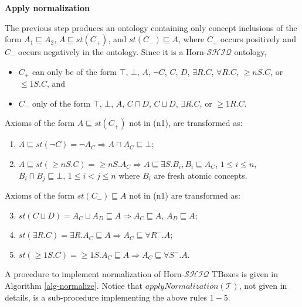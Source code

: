 \documentclass[oneside]{book}
\newcommand{\shiq}{$\mathcal{SHIQ}$\xspace}
\newcommand{\hshiq}{Horn-\shiq\xspace}
\newcommand{\T}{\mathcal{T}}
\newcommand{\dlisa}{\sqsubseteq}
\newcommand{\dland}{\sqcap}
\newcommand{\dlor}{\sqcup}
\begin{document}
\textbf{Apply normalization}

The previous step produces an ontology containing only concept inclusions of the form $A_1 \dlisa A_2$, $ A \dlisa st(C_+)$, and $st(C_-) \dlisa A$, where $C_+$ occurs positively and $C_-$ occurs negatively in the ontology. Since it is a \hshiq ontology, 
\begin{itemize}
	\item $C_+$ can only be of the form $\top$, $\bot$, $A$, $\neg C$, $C$, $D$, $\exists R.C$, $\forall R.C$, $\geq nS.C$, or $\leq 1S.C$, and
	\item  $C_-$ only of the form $\top$, $\bot$, $A$, $C \dland D$, $C \dlor D$, $\exists R.C$, or $\geq 1R.C$.
\end{itemize}
Axioms of the form $A \dlisa st(C_+)$ not in (n1), are transformed as: 
\begin{enumerate}
	\item $A \dlisa st(\neg C) = \neg A_C \Rightarrow A \dland  A_C \dlisa \bot$; 
	\item $A \dlisa st(\geq nS.C) = \geq nS.A_C \Rightarrow A \dlisa \exists S.B_i, B_i \dlisa A_C$, $1 \leq i \leq n$, $B_i \dland B_j \dlisa \bot$, $1 \leq i < j \leq n$ where $B_i$ are fresh atomic concepts.
\end{enumerate}

Axioms of the form $st(C_-) \dlisa A$ not in (n1) are transformed as:
\begin{enumerate}
	\setcounter{enumi}{2}
	\item $st(C \dlor D)= A_C \dlor A_D  \dlisa A \Rightarrow A_C \dlisa A$, $A_D \dlisa A$;
	\item $st(\exists R.C)=\exists R.A_C  \dlisa A \Rightarrow A_C \dlisa \forall R^-.A$;
	\item $st(\geq 1S.C) = \geq 1S.A_C \dlisa A \Rightarrow A_C \dlisa \forall S^-.A$.
\end{enumerate}

A procedure to implement normalization of \hshiq TBoxes is given in Algorithm \ref{alg-normalize}. Notice that $applyNormalization(\T)$, not given in details, is a sub-procedure implementing the above rules $1 - 5$.

%
%
\end{document}
